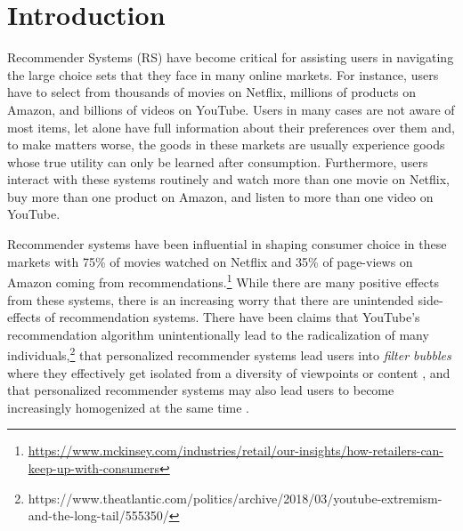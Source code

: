 \documentclass[sigconf]{acmart}
\begin{document}
%
%
\author{Guy Aridor}

\author{Duarte Gon\c{c}alves}
  
  \author{Shan Sikdar}
%

%

\maketitle

\section{Introduction}

Recommender Systems (RS) have become critical for assisting users in navigating the large choice sets that they face in many online markets. For instance, users have to select from thousands of movies on Netflix, millions of products on Amazon, and billions of videos on YouTube. Users in many cases are not aware of most items, let alone have full information about their preferences over them and, to make matters worse, the goods in these markets are usually experience goods whose true utility can only be learned after consumption. Furthermore, users interact with these systems routinely and watch more than one movie on Netflix, buy more than one product on Amazon, and listen to more than one video on YouTube.
\par

Recommender systems have been influential in shaping consumer choice in these markets with 75\% of movies watched on Netflix and 35\% of page-views on Amazon coming from recommendations.\footnote{\url{https://www.mckinsey.com/industries/retail/our-insights/how-retailers-can-keep-up-with-consumers}} While there are many positive effects from these systems, there is an increasing worry that there are unintended side-effects of recommendation systems. There have been claims that YouTube's recommendation algorithm unintentionally lead to the radicalization of many individuals,\footnote{https://www.theatlantic.com/politics/archive/2018/03/youtube-extremism-and-the-long-tail/555350/} that personalized recommender systems lead users into \textit{filter bubbles} where they effectively get isolated from a diversity of viewpoints or content \cite{pariser2011filter}, and that personalized recommender systems may also lead users to become increasingly homogenized at the same time \cite{chaney2018algorithmic, hosanagar2013will}.
\par
\end{document}
